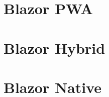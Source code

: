 \section{Blazor PWA}\label{sez:bpwa}


\section{Blazor Hybrid}\label{sez:bhybrid}


\section{Blazor Native}\label{sez:bnative}

%
%
%
